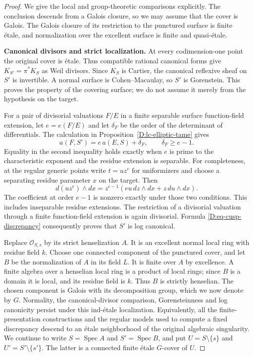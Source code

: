 \begin{proof}
We give the local and group-theoretic comparisons explicitly.
The conclusion descends from a Galois closure, so we may assume
that the cover is Galois.  The Galois closure of its restriction
to the punctured surface is finite \'etale, and normalization
over the excellent surface is finite and quasi-\'etale.

\par\smallskip\noindent\textbf{Canonical divisors and strict localization.}\quad
At every codimension-one point the original cover is \'etale.
Thus compatible rational canonical forms give
$K_{S'}=\pi^*K_S$ as Weil divisors.  Since $K_S$ is Cartier,
the canonical reflexive sheaf on $S'$ is invertible.
A normal surface is Cohen--Macaulay, so $S'$ is Gorenstein.
This proves the property of the covering surface; we do not
assume it merely from the hypothesis on the target.

For a pair of divisorial valuations $F/E$ in a finite separable
surface function-field extension, let $e=e(F/E)$ and let
$\delta_F$ be the order of the determinant of differentials.
The calculation in Proposition~\ref{D:lc-elliptic-tame} gives
\begin{equation}\label{D:eq-cusp-discrepancy}
 a(F,S')=e\,a(E,S)+\delta_F,
 \qquad \delta_F\geq e-1.
\end{equation}
Equality in the second inequality holds exactly when $e$ is
prime to the characteristic exponent and the residue extension is
separable.  For completeness, at the regular generic points
write $t=u z^e$ for uniformizers and choose a separating residue
parameter $x$ on the target.  Then
\[
 d(u z^e)\wedge dx
 =z^{e-1}(eu\,dz\wedge dx+z\,du\wedge dx).
\]
The coefficient at order $e-1$ is nonzero exactly under those
two conditions.  This includes inseparable residue extensions.
The restriction of a divisorial valuation through a finite
function-field extension is again divisorial.  Formula
\eqref{D:eq-cusp-discrepancy} consequently proves that $S'$ is
log canonical.

Replace $\mathcal O_{S,s}$ by its strict henselization $A$.
It is an excellent normal local ring with residue field $k$.
Choose one connected component of the punctured cover, and let
$B$ be the normalization of $A$ in its field $L$.
It is finite over $A$ by excellence.  A finite algebra over a
henselian local ring is a product of local rings; since $B$ is
a domain it is local, and its residue field is $k$.  Thus $B$
is strictly henselian.  The chosen component is Galois with
its decomposition group, which we now denote by $G$.
Normality, the canonical-divisor comparison, Gorensteinness and
log canonicity persist under this ind-\'etale localization.
Equivalently, all the finite-presentation constructions and the
regular models used to compute a fixed discrepancy descend to
an \'etale neighborhood of the original algebraic singularity.
We continue to write $S=\operatorname{Spec}A$ and
$S'=\operatorname{Spec}B$, and put
$U=S\setminus\{s\}$ and $U'=S'\setminus\{s'\}$.
The latter is a connected finite \'etale $G$-cover of $U$.


\end{proof}
